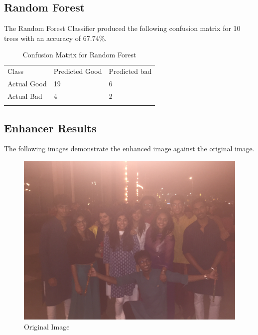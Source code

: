 \subsection{Random Forest}
The Random Forest Classifier produced the following confusion matrix for 10 trees with an accuracy of 67.74\%.
\begin{table}[H]
\caption{Confusion Matrix for Random Forest}
\label{tab:1}       %
\begin{tabular}{lll}
\hline\noalign{\smallskip}
Class & Predicted Good & Predicted bad  \\
\noalign{\smallskip}\hline\noalign{\smallskip}
Actual Good & 19 & 6 \\
Actual Bad & 4 & 2 \\
\noalign{\smallskip}\hline
\end{tabular}
\end{table}

\subsection{Enhancer Results}
The following images demonstrate the enhanced image against the original image.
\begin{figure}[!h]
  \includegraphics[scale=0.07]{party_foggy_dark.jpg}
\caption{Original Image}
\label{fig:3}       
\end{figure}

